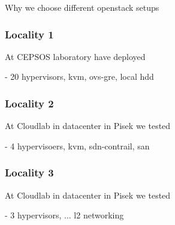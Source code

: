 Why we choose different openstack setups

\subsubsection{Locality 1}

At CEPSOS laboratory have deployed 

- 20 hypervisors, kvm, ovs-gre, local hdd

\subsubsection{Locality 2}

At Cloudlab in datacenter in Pisek we tested

- 4 hypervisoers, kvm, sdn-contrail, san

\subsubsection{Locality 3}

At Cloudlab in datacenter in Pisek we tested

- 3 hypervisors, ... l2 networking 

